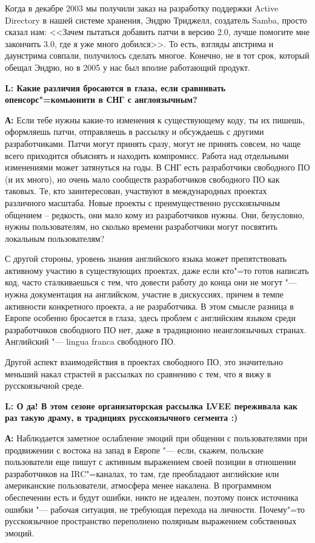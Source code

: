 \documentclass[10pt, a5paper]{article}
\begin{document}
Когда в декабре 2003 мы получили заказ на разработку поддержки Active Directory
в нашей системе хранения, Эндрю Триджелл, создатель Samba, просто сказал нам:
<<Зачем пытаться добавить патчи в версию 2.0, лучше помогите мне закончить 3.0,
где я уже много добился>>. То есть, взгляды апстрима и даунстрима совпали,
получилось сделать многое. Конечно, не в тот срок, который обещал Эндрю, но в
2005 у нас был вполне работающий продукт.

{\noindent \bf L: Какие различия бросаются в глаза, если сравнивать
опенсорс"=комьюнити в СНГ с англоязычным? }

{\noindent \bf А:} Если тебе нужны какие-то изменения к существующему коду, ты их пишешь,
оформляешь патчи, отправляешь в рассылку и обсуждаешь с другими разработчиками.
Патчи могут принять сразу, могут не принять совсем, но чаще всего приходится
объяснять и находить компромисс. Работа над отдельными изменениями может
затянуться на годы. В СНГ есть разработчики свободного ПО (и их много), но
очень мало сообществ разработчиков свободного ПО как таковых. Те, кто
заинтересован, участвуют в международных проектах различного масштаба. Новые
проекты с преимущественно русскоязычным общением -- редкость, они мало кому из
разработчиков нужны. Они, безусловно, нужны пользователям, но сколько времени
разработчики могут посвятить локальным пользователям?

С другой стороны, уровень знания английского языка может препятствовать
активному участию в существующих проектах, даже если кто"=то готов написать
код, часто сталкиваешься с тем, что довести работу до конца они не могут "---
нужна документация на английском, участие в дискуссиях, причем в темпе
активности конкретного проекта, а не разработчика.  В этом смысле разница в
Европе особенно бросается в глаза, здесь проблем с английским языком среди
разработчиков свободного ПО нет, даже в традиционно неанглоязычных странах.
Английский "--- lingua franca свободного ПО.

Другой аспект взаимодействия в проектах свободного ПО, это значительно меньший
накал страстей в рассылках по сравнению с тем, что я вижу в русскоязычной
среде. 

{\noindent \bf L: О да! В этом сезоне организаторская рассылка LVEE переживала 
как раз такую драму, в традициях русскоязычного сегмента :) }

{\noindent \bf А:} Наблюдается заметное ослабление эмоций при общении с пользователями при
продвижении с востока на запад в Европе "--- если, скажем, польские пользователи
еще пишут с активным выражением своей позиции в отношении разработчиков на IRC"=каналах, 
то там, где преобладают английские или американские пользователи,
атмосфера менее накалена. В программном обеспечении есть и будут ошибки, никто
не идеален, поэтому поиск источника ошибки "--- рабочая ситуация, не требующая
перехода на личности. Почему"=то русскоязычное пространство переполнено полярным
выражением собственных эмоций.
\end{document}
